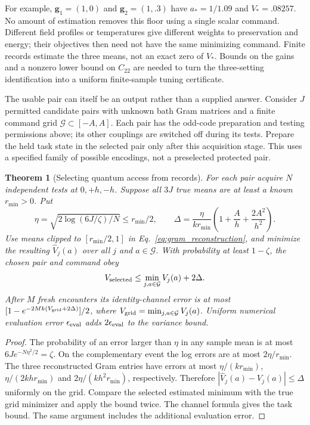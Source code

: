 \documentclass[11pt]{article}
\newtheorem{theorem}{Theorem}[section]
\theoremstyle{definition}
\theoremstyle{remark}
\begin{document}
For example, $\boldsymbol g_1=(1,0)$ and
$\boldsymbol g_2=(1,.3)$ have $a_*=1/1.09$ and
$V_*=.08257$. No amount of estimation removes this floor using a
single scalar command. Different field profiles or temperatures give
different weights to preservation and energy; their objectives then
need not have the same minimizing command. Finite records estimate
the three means, not an exact zero of $V_*$. Bounds on the gains and
a nonzero lower bound on $C_{22}$ are needed to turn the three-setting
identification into a uniform finite-sample tuning certificate.

The usable pair can itself be an output rather than a supplied answer.
Consider $J$ permitted candidate pairs with unknown bath Gram matrices
and a finite command grid $\mathcal G\subset[-A,A]$. Each pair has
the odd-code preparation and testing permissions above; its other
couplings are switched off during its tests. Prepare the held task
state in the selected pair only after this acquisition stage.
This uses a specified family of possible encodings, not a preselected
protected pair.

\begin{theorem}[Selecting quantum access from records]
\label{thm:quantum_pair_selection}
For each pair acquire $N$ independent tests at $0,+h,-h$.
Suppose all $3J$ true means are at least a known $r_{\min}>0$.
Put
\[
 \eta=\sqrt{2\log(6J/\zeta)/N}\le r_{\min}/2,\qquad
 \Delta=\frac{\eta}{kr_{\min}}
       \left(1+\frac A h+\frac{2A^2}{h^2}\right).
\]
Use means clipped to $[r_{\min}/2,1]$ in
Eq.~\eqref{eq:gram_reconstruction}, and minimize the resulting
$\widehat V_j(a)$ over all $j$ and $a\in\mathcal G$.
With probability at least $1-\zeta$, the chosen pair and command obey
\begin{equation}
 V_{\rm selected}\le
       \min_{j,a\in\mathcal G}V_j(a)+2\Delta.
 \label{eq:pair_oracle}
\end{equation}
After $M$ fresh encounters its identity-channel error is at most
$[1-e^{-2Mk(V_{\rm grid}+2\Delta)}]/2$, where
$V_{\rm grid}=\min_{j,a\in\mathcal G}V_j(a)$.
Uniform numerical evaluation error $\epsilon_{\rm eval}$ adds
$2\epsilon_{\rm eval}$ to the variance bound.
\end{theorem}
\begin{proof}
The probability of an error larger than $\eta$ in any sample mean
is at most $6Je^{-N\eta^2/2}=\zeta$.
On the complementary event the log errors are at most
$2\eta/r_{\min}$. The three reconstructed Gram entries have
errors at most
$\eta/(kr_{\min})$, $\eta/(2kh r_{\min})$ and
$2\eta/(kh^2r_{\min})$, respectively. Therefore
$|\widehat V_j(a)-V_j(a)|\le\Delta$ uniformly on the grid.
Compare the selected estimated minimum with the true grid minimizer
and apply the bound twice. The channel formula gives the task bound.
The same argument includes the additional evaluation error.
\end{proof}
\end{document}
